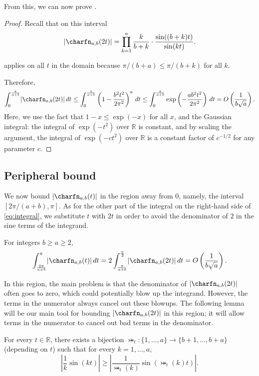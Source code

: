 \documentclass{toc}
\begin{document}
From this, we can now prove .

\begin{proof}
    Recall that on this interval
    \[\lvert\charfn_{a,b}(2t)\rvert=\prod_{k=1}^{a} \frac{k}{b+k}\cdot\frac{\sin((b+k)t)}{\sin(kt)}.\]
    
 applies on all $t$ in the domain because $\pi/(b+a)\le \pi/(b+k)$ for all $k$.
    
    Therefore,
    \[\int_0^{\frac{\pi}{a+b}} \lvert\charfn_{a,b}(2t)\rvert\,dt \le \int_0^{\frac{\pi}{a+b}} \left(1-\frac{b^2t^2}{2\pi^2}\right)^a\,dt \le \int_0^{\frac{\pi}{a+b}} \exp\left(-\frac{ab^2t^2}{2\pi^2}\right)\,dt =O\left(\frac{1}{b\sqrt{a}}\right). \]
    Here, we use the fact that $1-x\le \exp(-x)$ for all $x$, and the Gaussian integral: the integral of $\exp(-t^2)$ over $\mathbb{R}$ is constant, and by scaling the argument, the integral of $\exp(-ct^2)$ over $\mathbb{R}$ is a constant factor of $c^{-1/2}$ for any parameter $c$. 
\end{proof}

\subsection{Peripheral bound}
\label{sec:peripheral}

We now bound $\lvert\charfn_{a,b}(t)\rvert$ in the region away from $0$, namely, the interval $[2\pi/(a+b),\pi]$. As for the other part of the integral on the right-hand side of \eqref{eq:integral}, we substitute $t$ with $2t$ in order to avoid the denominator of $2$ in the sine terms of the integrand. 

\begin{lemma}
    \label{lemma:far}
    For integers $b\ge a\ge 2$,
    \[ \int_{\frac{2\pi}{a+b}}^\pi \lvert\charfn_{a,b}(t)\rvert\, dt =  2 \int_{\frac{\pi}{a+b}}^{\frac{\pi}{2}} \lvert\charfn_{a,b}(2t)\rvert\, dt = O\left(\frac{1}{b\sqrt{a}}\right). \]    
\end{lemma}

In this region, the main problem is that the denominator of $\lvert\charfn_{a,b}(2t)\rvert$ often goes to zero, which could potentially blow up the integrand. However, the terms in the numerator always cancel out these blowups. The following lemma will be our main tool for bounding $\lvert\charfn_{a,b}(2t)\rvert$ in this region; it will allow terms in the numerator to cancel out bad terms in the denominator.

\begin{lemma}
    \label{lemma:bijection}
    For every $t\in\mathbb{R}$, there exists a bijection $\bij_t:\{1,\dots,a\}\to\{b+1,\dots,b+a\}$ (depending on $t$) such that for every $k=1,\dots,a$,
    \[\left|\frac{1}{k}\sin(kt)\right| \ge \left|\frac{1}{\bij_t(k)}\sin(\bij_t(k)t)\right|. \]
\end{lemma}
\end{document}
